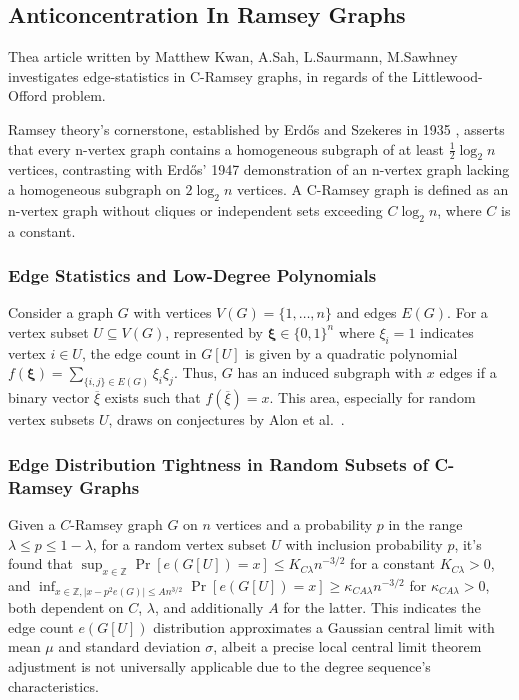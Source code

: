 
\subsection{Anticoncentration In Ramsey Graphs}\label{sec:anticoncentration}
Thea article written by Matthew Kwan, A.Sah, L.Saurmann, M.Sawhney 
\cite{kwan2022anticoncentration} investigates edge-statistics in C-Ramsey graphs,
in regards of the Littlewood-Offord problem.

Ramsey theory's cornerstone,
established by Erdős and Szekeres in 1935
\cite{erdos1935combinatorial},
asserts that every n-vertex graph contains a homogeneous subgraph of
at least $\frac{1}{2} \log_2{n}$ vertices, contrasting with Erdős' 1947 demonstration
\cite{erdos1947some} of an n-vertex graph lacking a homogeneous 
subgraph on $2 \log_2{n}$ vertices. A C-Ramsey graph is defined as an 
n-vertex graph without cliques or independent sets exceeding \(C \log_2 n\),
where \(C\) is a constant.

\subsubsection{Edge Statistics and Low-Degree Polynomials}
Consider a graph $G$ with vertices $V(G) = \{1, \ldots, n\}$ and edges $E(G)$. For a vertex subset $U \subseteq V(G)$, represented by $\mathbf{\xi} \in \{0,1\}^n$ where $\xi_i = 1$ indicates vertex $i \in U$, the edge count in $G[U]$ is given by a quadratic polynomial $f(\mathbf{\xi}) = \sum_{\{i,j\} \in E(G)} \xi_i \xi_j$. Thus, $G$ has an induced subgraph with $x$ edges if a binary vector $\overline{\xi}$ exists such that $f(\overline{\xi})=x$. This area, especially for random vertex subsets $U$, draws on conjectures by Alon et al.~\cite{alon2020edge}.


\subsubsection{Edge Distribution Tightness in Random Subsets of C-Ramsey Graphs}
Given a $C$-Ramsey graph $G$ on $n$ vertices and a probability $p$ in the range $\lambda \leq p \leq 1 - \lambda$, for a random vertex subset $U$ with inclusion probability $p$, it's found that $\sup_{x \in \mathbb{Z}} \Pr[e(G[U]) = x] \leq K_{C\lambda} n^{-3/2}$ for a constant $K_{C\lambda} > 0$, and $\inf_{x \in \mathbb{Z}, |x - p^2 e(G)| \leq An^{3/2}} \Pr[e(G[U]) = x] \geq \kappa_{C A \lambda} n^{-3/2}$ for $\kappa_{C A \lambda} > 0$, both dependent on $C$, $\lambda$, and additionally $A$ for the latter. This indicates the edge count $e(G[U])$ distribution approximates a Gaussian central limit with mean $\mu$ and standard deviation $\sigma$, albeit a precise local central limit theorem adjustment is not universally applicable due to the degree sequence's characteristics.


